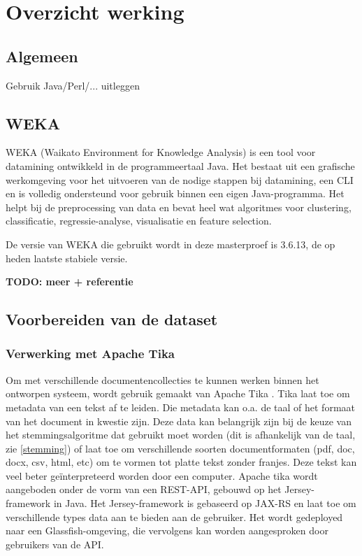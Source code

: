 \chapter{Overzicht werking}\label{hs:werking}

\section{Algemeen}
Gebruik Java/Perl/... uitleggen

\section{WEKA}
WEKA (Waikato Environment for Knowledge Analysis) is een tool voor datamining ontwikkeld in de programmeertaal Java. Het bestaat uit een grafische werkomgeving  voor het uitvoeren van de nodige stappen bij datamining, een CLI en is volledig ondersteund voor gebruik binnen een eigen Java-programma. Het helpt bij de preprocessing van data en bevat heel wat algoritmes voor clustering, classificatie, regressie-analyse, visualisatie en feature selection.

De versie van WEKA die gebruikt wordt in deze masterproef is 3.6.13, de op heden laatste stabiele versie.

\textbf{TODO: meer + referentie}

\section{Voorbereiden van de dataset}
\subsection{Verwerking met Apache Tika}
Om met verschillende documentencollecties te kunnen werken binnen het ontworpen systeem, wordt gebruik gemaakt van Apache Tika \cite{tika}. Tika laat toe om metadata van een tekst af te leiden. Die metadata kan o.a. de taal of het formaat van het document in kwestie zijn. Deze data kan belangrijk zijn bij de keuze van het stemmingsalgoritme dat gebruikt moet worden (dit is afhankelijk van de taal, zie \ref{stemming}) of laat toe om verschillende soorten documentformaten (pdf, doc, docx, csv, html, etc) om te vormen tot platte tekst zonder franjes. Deze tekst kan veel beter ge\"interpreteerd worden door een computer.
Apache tika wordt aangeboden onder de vorm van een REST-API, gebouwd op het Jersey-framework in Java. Het Jersey-framework is gebaseerd op JAX-RS en laat toe om verschillende types data aan te bieden aan de gebruiker. Het wordt gedeployed naar een Glassfish-omgeving, die vervolgens kan worden aangesproken door gebruikers van de API.

